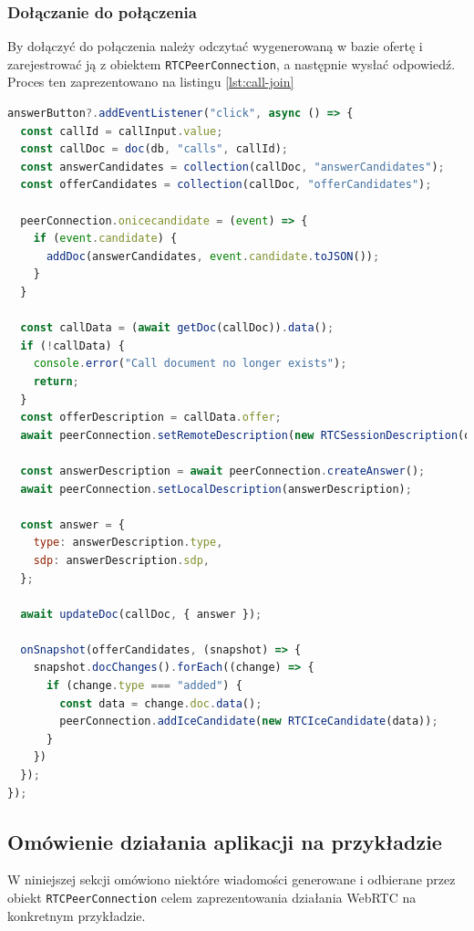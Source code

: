 \subsubsection{Dołączanie do połączenia}

By dołączyć do połączenia należy odczytać wygenerowaną w bazie ofertę i zarejestrować ją z obiektem
\verb|RTCPeerConnection|, a następnie wysłać odpowiedź. Proces ten zaprezentowano na listingu \ref{lst:call-join}

\begin{lstlisting}[language=Javascript,label=lst:call-join, caption=Dołączanie do połączenia połączenia,
basicstyle=\footnotesize \ttfamily, showtabs=true, tabsize=4]
answerButton?.addEventListener("click", async () => {
  const callId = callInput.value;
  const callDoc = doc(db, "calls", callId);
  const answerCandidates = collection(callDoc, "answerCandidates");
  const offerCandidates = collection(callDoc, "offerCandidates");

  peerConnection.onicecandidate = (event) => {
    if (event.candidate) {
      addDoc(answerCandidates, event.candidate.toJSON());
    }
  }

  const callData = (await getDoc(callDoc)).data();
  if (!callData) {
    console.error("Call document no longer exists");
    return;
  }
  const offerDescription = callData.offer;
  await peerConnection.setRemoteDescription(new RTCSessionDescription(offerDescription));

  const answerDescription = await peerConnection.createAnswer();
  await peerConnection.setLocalDescription(answerDescription);

  const answer = {
    type: answerDescription.type,
    sdp: answerDescription.sdp,
  };

  await updateDoc(callDoc, { answer });

  onSnapshot(offerCandidates, (snapshot) => {
    snapshot.docChanges().forEach((change) => {
      if (change.type === "added") {
        const data = change.doc.data();
        peerConnection.addIceCandidate(new RTCIceCandidate(data));
      }
    })
  });
});
\end{lstlisting}

\subsection{Omówienie działania aplikacji na przykładzie}

W niniejszej sekcji omówiono niektóre wiadomości generowane i odbierane przez obiekt
\verb|RTCPeerConnection| celem zaprezentowania działania WebRTC na konkretnym przykładzie.

